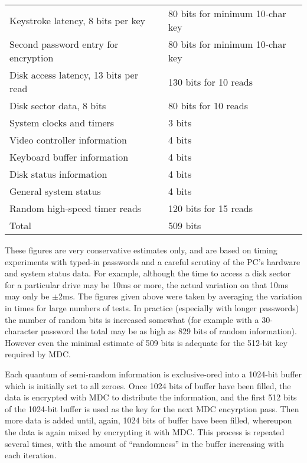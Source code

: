 \begin{center}
\begin{tabular}{l|l}

    Keystroke latency, 8 bits per key     & 80 bits for minimum 10-char key\\
    Second password entry for encryption  & 80 bits for minimum 10-char key\\
    Disk access latency, 13 bits per read &130 bits for 10 reads\\
    Disk sector data, 8 bits              & 80 bits for 10 reads\\
    System clocks and timers              &  3 bits\\
    Video controller information          &  4 bits\\
    Keyboard buffer information           &  4 bits\\
    Disk status information               &  4 bits\\
    General system status                 &  4 bits\\
    Random high-speed timer reads         &120 bits for 15 reads\\
 \hline
    Total                                 &509 bits\\
\end{tabular}
\end{center}

These figures are very conservative estimates only, and are based on timing
experiments with typed-in passwords and a careful scrutiny of the PC's hardware
and system status data.  For example, although the time to access a disk sector
for a particular drive may be 10ms or more, the actual variation on that 10ms
may only be $\pm$2ms.  The figures given above were taken by averaging the
variation in times for large numbers of tests.  In practice (especially with 
longer passwords) the number of random bits is increased somewhat (for example 
with a 30-character password the total may be as high as 829 bits of random 
information).  However even the minimal estimate of 509 bits is adequate for 
the 512-bit key required by MDC.

Each quantum of semi-random information is exclusive-ored into a 1024-bit
buffer which is initially set to all zeroes.  Once 1024 bits of buffer have
been filled, the data is encrypted with MDC to distribute the information, and
the first 512 bits of the 1024-bit buffer is used as the key for the next MDC
encyrption pass.  Then more data is added until, again, 1024 bits of buffer
have been filled, whereupon the data is again mixed by encrypting it with MDC.
This process is repeated several times, with the amount of ``randomness'' in the
buffer increasing with each iteration.


